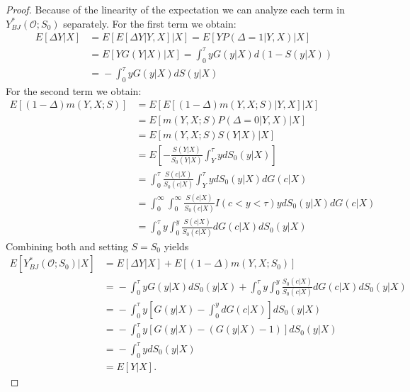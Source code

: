 \documentclass[12pt, a4paper]{scrartcl}
\theoremstyle{definition}
\theoremstyle{plain}
\numberwithin{equation}{section}
\numberwithin{figure}{section}
\numberwithin{table}{section}
\begin{document}
\begin{appendices}
\begin{proof}
			Because of the linearity of the expectation we can analyze each term in $Y_{BJ}^*(\mathcal{O}; S_0)$ separately.
			For the first term we obtain:
			\begin{equation*}
			\begin{split}
			E[\Delta Y\vert X] &={} E[E[\Delta Y \vert Y, X]\vert X] = E[Y P(\Delta = 1\vert Y,X)\vert X]\\
			&={} E[Y G(Y\vert X)\vert X] = \int_{0}^{\tau} y G(y\vert X)d(1-S(y\vert X))\\
			&={} - \int_{0}^{\tau} y G(y\vert X)dS(y\vert X)
			\end{split}
			\end{equation*}
			For the second term we obtain:
			\begin{equation*}
			\begin{split}
			E[(1-\Delta)m(Y,X;S)] &={} E[E[(1-\Delta)m(Y,X;S)\vert Y,X]\vert X]\\
			&={} E[m(Y,X;S)P(\Delta = 0\vert Y, X)\vert X]\\
			&={} E[m(Y,X;S)S(Y\vert X)\vert X]\\
			&={} E\left[-\frac{S(Y\vert X)}{S_0(Y\vert X)}\int_{Y}^{\tau}ydS_0(y\vert X)\right]\\
			&={} \int_{0}^{\tau}\frac{S(c\vert X)}{S_0(c\vert X)}\int_{Y}^{\tau}ydS_0(y\vert X)dG(c\vert X)\\
			&={} \int_0^{\infty}\int_0^{\infty} \frac{S(c\vert X)}{S_0(c\vert X)} I(c <y<\tau) y dS_0(y\vert X)dG(c\vert X)\\
			&={} \int_0^{\tau}y\int_0^y \frac{S(c\vert X)}{S_0(c\vert X)} dG(c\vert X)dS_0(y\vert X)
			\end{split}
			\end{equation*}
			Combining both and setting $S=S_0$ yields
			\begin{equation*}
			\begin{split}
			E[Y_{BJ}^*(\mathcal{O}; S_0)\vert X] &= E[\Delta Y\vert X] + E[(1-\Delta)m(Y,X;S_0)]\\
			&={} - \int_{0}^{\tau} y G(y\vert X)dS_0(y\vert X) + \int_0^{\tau}y\int_0^y \frac{S_0(c\vert X)}{S_0(c\vert X)} dG(c\vert X)dS_0(y\vert X)\\
			&={} - \int_{0}^{\tau} y \left[G(y\vert X)-\int_0^ydG(c\vert X)\right]dS_0(y\vert X)\\
			&={} - \int_{0}^{\tau} y \left[G(y\vert X)-(G(y\vert X)-1)\right]dS_0(y\vert X)\\
			&={} - \int_{0}^{\tau} ydS_0(y\vert X)\\
			&={} E[Y\vert X].
			\end{split}
			\end{equation*}
		\end{proof}

\end{appendices}
\end{document}
